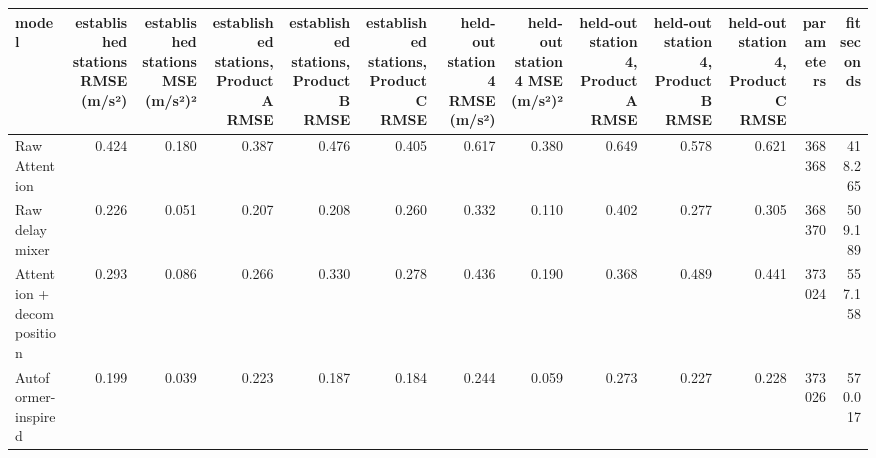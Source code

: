 \begin{tabular}{lrrrrrrrrrrrr}
\toprule
model & established stations RMSE (m/s²) & established stations MSE (m/s²)² & established stations, Product A RMSE & established stations, Product B RMSE & established stations, Product C RMSE & held-out station 4 RMSE (m/s²) & held-out station 4 MSE (m/s²)² & held-out station 4, Product A RMSE & held-out station 4, Product B RMSE & held-out station 4, Product C RMSE & parameters & fit seconds \\
\midrule
Raw Attention & 0.424 & 0.180 & 0.387 & 0.476 & 0.405 & 0.617 & 0.380 & 0.649 & 0.578 & 0.621 & 368368 & 418.265 \\
Raw delay mixer & 0.226 & 0.051 & 0.207 & 0.208 & 0.260 & 0.332 & 0.110 & 0.402 & 0.277 & 0.305 & 368370 & 509.189 \\
Attention + decomposition & 0.293 & 0.086 & 0.266 & 0.330 & 0.278 & 0.436 & 0.190 & 0.368 & 0.489 & 0.441 & 373024 & 557.158 \\
Autoformer-inspired & 0.199 & 0.039 & 0.223 & 0.187 & 0.184 & 0.244 & 0.059 & 0.273 & 0.227 & 0.228 & 373026 & 570.017 \\
\bottomrule
\end{tabular}
